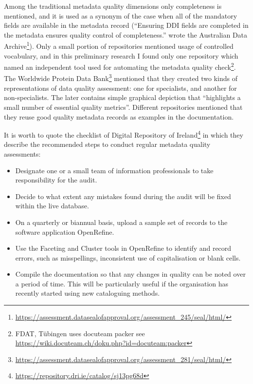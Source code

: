 Among the traditional metadata quality dimensions only completeness is mentioned, and it is used as a synonym of the case when all of the mandatory fields are available in the metadata record (``Ensuring DDI fields are completed in the metadata ensures quality control of completeness.'' wrote the Australian Data Archive\footnote{\url{https://assessment.datasealofapproval.org/assessment_245/seal/html/}}). Only a small portion of repositories mentioned usage of controlled vocabulary, and in this preliminary research I found only one repository which named an independent tool used for automating the metadata quality check\footnote{FDAT, Tübingen uses docuteam packer see \url{https://wiki.docuteam.ch/doku.php?id=docuteam:packer}}. The Worldwide Protein Data Bank\footnote{\url{https://assessment.datasealofapproval.org/assessment_281/seal/html/}} mentioned that they created two kinds of representations of data quality assessment: one for specialists, and another for non-specialists. The later contains simple graphical depiction that ``highlights a small number of essential quality metrics''. Different repositories mentioned that they reuse good quality metadata records as examples in the documentation.

It is worth to quote the checklist of Digital Repository of Ireland\footnote{\url{https://repository.dri.ie/catalog/sj13pg68d}} in which they describe the recommended steps to conduct regular metadata quality assessments:

\begin{itemize}
  \setlength{\parskip}{0pt}
  \setlength{\itemsep}{0pt plus 1pt}
  \item Designate one or a small team of information professionals to take responsibility for the audit.
  \item Decide to what extent any mistakes found during the audit will be fixed within the live database.
  \item On a quarterly or biannual basis, upload a sample set of records to the software application OpenRefine.
  \item Use the Faceting and Cluster tools in OpenRefine to identify and record errors, such as misspellings, inconsistent use of capitalisation or blank cells.
  \item Compile the documentation so that any changes in quality can be noted over a period of time. This will be particularly useful if the organisation has recently started using new cataloguing methods.
\end{itemize}

